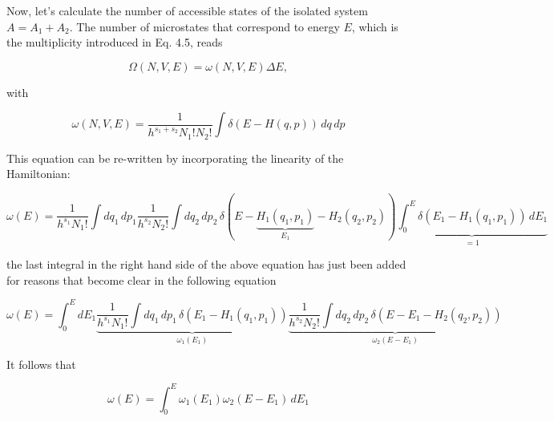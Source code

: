 \documentclass[12pt,a4paper]{report}
\newcommand{\esp}{\vspace{0.5cm}}
\begin{document}
	\esp
	
	Now, let’s calculate the number of accessible states of the isolated system $A = A_1 + A_2$. The number of microstates that correspond to energy $E$, which is the multiplicity introduced in Eq. 4.5, reads
	
	\esp
	
	\begin{equation}
		\Omega(N, V, E) = \omega(N, V, E) \Delta E,
	\end{equation}
	
	\esp
	
	\noindent with
	
	\esp
	
	\begin{equation}
		\omega(N, V, E) = \frac{1}{h^{s_1+s_2} N_1! N_2!} \int \delta(E - H(q, p)) \, dq \, dp
	\end{equation}
	
	\esp
	
	\noindent This equation can be re-written by incorporating the linearity of the Hamiltonian:
	
	\esp
	
	\begin{equation}
		\omega(E) = \frac{1}{h^{s_1} N_1!} \int dq_1 \, dp_1 \frac{1}{h^{s_2} N_2!} \int dq_2 \, dp_2 \, \delta(E - \underbrace{H_1(q_1, p_1)}_{E_1} - H_2(q_2, p_2)) \underbrace{\int_0^E \delta(E_1 - H_1(q_1, p_1)) \, dE_1}_{=1}
	\end{equation}
	
	\esp
	
	\noindent the last integral in the right hand side of the above equation has just been added for reasons that become clear in the following equation
	
	\esp
	
	\begin{equation}
		\omega(E) = \int_0^E dE_1 \underbrace{\frac{1}{h^{s_1} N_1!} \int dq_1 \, dp_1 \, \delta(E_1 - H_1(q_1, p_1))}_{\omega_1(E_1)} \underbrace{\frac{1}{h^{s_2} N_2!} \int dq_2 \, dp_2 \, \delta(E - E_1 - H_2(q_2, p_2))}_{\omega_2(E-E_1)}
	\end{equation}
	
	\esp
	
	\noindent It follows that
	
	\esp
	
	\begin{equation}
		\omega(E) = \int_0^E \omega_1(E_1) \omega_2(E - E_1) \, dE_1
	\end{equation}
	
\end{document}
